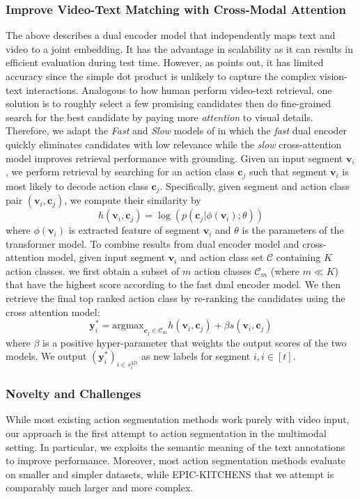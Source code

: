 \subsubsection{Improve Video-Text Matching with Cross-Modal Attention}
The above describes a dual encoder model that independently maps text and video to a joint embedding. It has the advantage in scalability as it can results in efficient evaluation during test time. However, as  points out, it has limited accuracy since the simple dot product is unlikely to capture the complex vision-text interactions. Analogous to how human perform video-text retrieval, one solution is to roughly select a few promising candidates then do fine-grained search for the best candidate by paying more \emph{attention} to visual details. Therefore, we adapt the \emph{Fast} and \emph{Slow} models of  in which the \emph{fast} dual encoder quickly eliminates candidates with low relevance while the \emph{slow} cross-attention model improves retrieval performance with grounding. Given an input segment $\mathbf{v}_i$, we perform retrieval by searching for an action class $\mathbf{c}_j$ such that segment $\mathbf{v}_i$ is most likely to decode action class $\mathbf{c}_j$. Specifically, given segment and action class pair $(\mathbf{v}_i, \mathbf{c}_j)$, we compute their similarity by \[
    h(\mathbf{v}_i, \mathbf{c}_j) = \log (p(\mathbf{c}_j|\phi(\mathbf{v}_i);\theta))
\]
where $\phi(\mathbf{v}_i)$ is extracted feature of segment $\mathbf{v}_i$ and $\theta$ is the parameters of the transformer model. To combine results from dual encoder model and cross-attention model, given input segment $\mathbf{v}_i$ and action class set $\mathcal{C}$ containing $K$ action classes. we first obtain a subset of $m$ action classes $\mathcal{C}_m$ (where $m \ll K$) that have the highest score according to the fast dual encoder model. We then retrieve the final top ranked action class by re-ranking the candidates using the cross attention model:
\[
    \mathbf{y}^*_i=\text{argmax}_{\mathbf{c}_j\in \mathcal{C}_m} h(\mathbf{v}_i, \mathbf{c}_j) + \beta s(\mathbf{v}_i,\mathbf{c}_j)
\]
where $\beta$ is a positive hyper-parameter that weights the output scores of the two models. We output $(\mathbf{y}^*_i)_{i\in s_i^{3D}}$ as new labels for segment $i,i\in[t]$.

\subsubsection{Novelty and Challenges}
While most existing action segmentation methods work purely with video input, our approach is the first attempt to action segmentation in the multimodal setting. In particular, we exploits the semantic meaning of the text annotations to improve performance. Moreover, most action segmentation methods evaluate on smaller and simpler datasets, while EPIC-KITCHENS that we attempt is comparably much larger and more complex.

